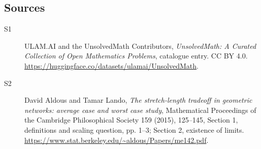 \documentclass[11pt]{article}
\begin{document}
\subsection{Sources}
\begin{description}
\item[\hypertarget{source:statement:1}{S1}] ULAM.AI and the UnsolvedMath Contributors, \emph{UnsolvedMath: A Curated Collection of Open Mathematics Problems}, catalogue entry. CC BY 4.0. \url{https://huggingface.co/datasets/ulamai/UnsolvedMath}.
\item[\hypertarget{source:statement:2}{S2}] David Aldous and Tamar Lando, \emph{The stretch-length tradeoff in geometric networks: average case and worst case study}, Mathematical Proceedings of the Cambridge Philosophical Society 159 (2015), 125--145, Section 1, definitions and scaling question, pp. 1--3; Section 2, existence of limits. \url{https://www.stat.berkeley.edu/~aldous/Papers/me142.pdf}.
\end{description}
\label{end:statement}
\end{document}
